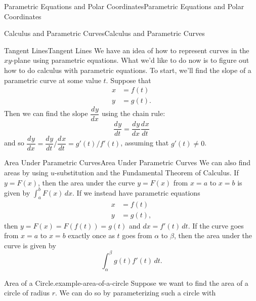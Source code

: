 \documentclass[10pt,]{book}
\numberwithin{equation}{section}
\newcommand{\dv}[3][]{\dfrac{d^{#1} #2}{d #3^{#1}}}
\begin{document}
\begin{chapterptx}{Parametric Equations and Polar Coordinates}{}{Parametric Equations and Polar Coordinates}{}{}
\begin{sectionptx}{Calculus and Parametric Curves}{}{Calculus and Parametric Curves}{}{}
%
%
\typeout{************************************************}
\typeout{************************************************}
%
\begin{subsectionptx}{Tangent Lines}{}{Tangent Lines}{}{}\label{subsection-tangent-lines}
\hypertarget{p-785}{}%
We have an idea of how to represent curves in the \(xy\)-plane using parametric equations. What we'd like to do now is to figure out how to do calculus with parametric equations. To start, we'll find the slope of a parametric curve at some value \(t\). Suppose that%
%
\begin{align*}
x & = f(t) \\
y & = g(t). 
\end{align*}
\hypertarget{p-786}{}%
Then we can find the slope \(\dv{y}{x}\) using the chain rule:%
%
\begin{equation*}
\dv{y}{t} = \dv{y}{x}\dv{x}{t}
\end{equation*}
\hypertarget{p-787}{}%
and so \(\dv{y}{x} = \dv{y}{t}/\dv{x}{t} = g'(t)/f'(t)\), assuming that \(g'(t)\neq0\).%
\end{subsectionptx}
%
%
\typeout{************************************************}
\typeout{************************************************}
%
\begin{subsectionptx}{Area Under Parametric Curves}{}{Area Under Parametric Curves}{}{}\label{subsection-area-under-parametric-curves}
\hypertarget{p-788}{}%
We can also find areas by using \(u\)-substitution and the Fundamental Theorem of Calculus. If \(y = F(x)\), then the area under the curve \(y=F(x)\) from \(x=a\) to \(x=b\) is given by \(\int_{a}^{b} F(x)\,dx\). If we instead have parametric equations%
%
\begin{align*}
x & = f(t) \\
y & = g(t), 
\end{align*}
\hypertarget{p-789}{}%
then \(y = F(x) = F(f(t)) = g(t)\) and \(dx = f'(t)\,dt\). If the curve goes from \(x=a\) to \(x=b\) exactly once as \(t\) goes from \(\alpha\) to \(\beta\), then the area under the curve is given by%
%
\begin{equation*}
\int_{\alpha}^{\beta}g(t)f'(t)\,dt.
\end{equation*}
\begin{example}{Area of a Circle.}{example-area-of-a-circle}%
\hypertarget{p-790}{}%
Suppose we want to find the area of a circle of radius \(r\). We can do so by parameterizing such a circle with%
%
\begin{align*}

\end{align*}
\end{example}
\end{subsectionptx}
\end{sectionptx}
\end{chapterptx}
\end{document}
